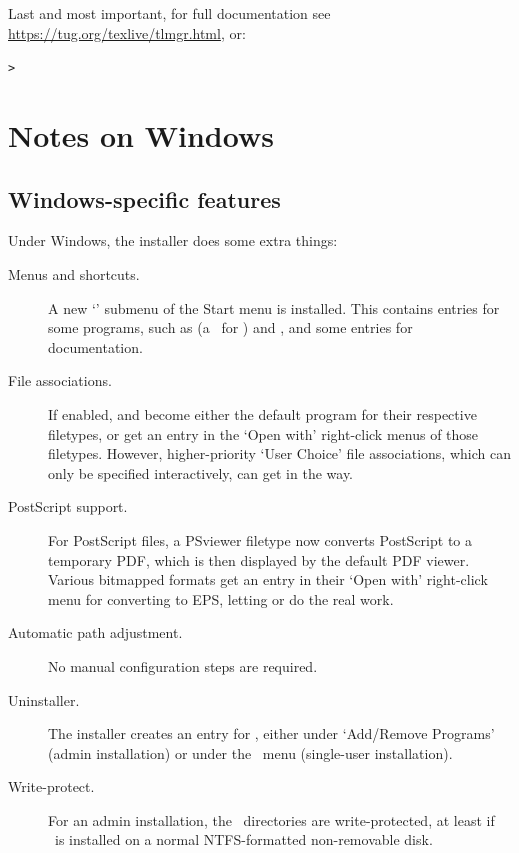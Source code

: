 \documentclass{article}
\begin{document}
Last and most important, for full documentation see
\url{https://tug.org/texlive/tlmgr.html}, or:
\begin{alltt}
> 
\end{alltt}


\section{Notes on Windows}
\label{sec:windows}

\subsection{Windows-specific features}
\label{sec:winfeatures}

Under Windows, the installer does some extra things:
\begin{description}
\item[Menus and shortcuts.] A new `\TL{}' submenu of the Start menu
  is installed. This contains entries for some \GUI{} programs, such
  as  (a \GUI\ for ) and , and some
  entries for documentation.

\item[File associations.] If enabled,  and 
  become either the default program for
  their respective filetypes, or get an entry in the `Open with'
  right-click menus of those filetypes. However,
  higher-priority `User Choice' file associations, which can only be
  specified interactively, can get in the way.

\item[PostScript support.] For PostScript files, a PSviewer filetype
  now converts PostScript to a temporary PDF, which is then
  displayed by the default PDF viewer. Various bitmapped formats get
  an entry  in their `Open with' right-click
  menu for converting to EPS, letting  or
   do the real work.

\item[Automatic path adjustment.] No manual configuration steps are required.

\item[Uninstaller.] The installer creates an entry for \TL, either
  under `Add/Remove Programs' (admin installation) or under the
  \TL\ menu (single-user installation).

\item[Write-protect.] For an admin installation, the \TL\ directories are
  write-protected, at least if \TL\ is installed on a normal
  NTFS-formatted non-removable disk.
\end{description}
\end{document}
